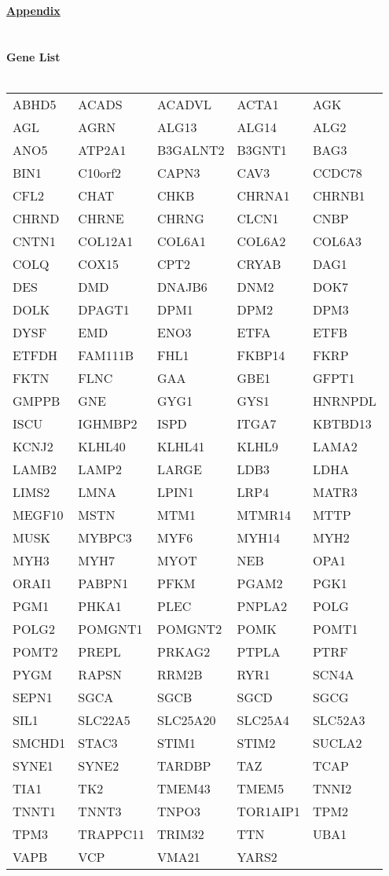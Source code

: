 {\Large \textbf{\underline{Appendix}}}
\\ \\ \\
{\Large \textbf{{Gene List}}}
\\ \\
\begin{small}
\begin{tabular}{ |p{3cm}|p{3cm}|p{3cm}|p{3cm}|p{3cm}| }
\hline

ABHD5 & ACADS & ACADVL & ACTA1 & AGK \\
AGL & AGRN & ALG13 & ALG14 & ALG2 \\
ANO5 & ATP2A1 & B3GALNT2 & B3GNT1 & BAG3 \\
BIN1 & C10orf2 & CAPN3 & CAV3 & CCDC78 \\
CFL2 & CHAT & CHKB & CHRNA1 & CHRNB1 \\
CHRND & CHRNE & CHRNG & CLCN1 & CNBP \\
CNTN1 & COL12A1 & COL6A1 & COL6A2 & COL6A3 \\
COLQ & COX15 & CPT2 & CRYAB & DAG1 \\
DES & DMD & DNAJB6 & DNM2 & DOK7 \\
DOLK & DPAGT1 & DPM1 & DPM2 & DPM3 \\
DYSF & EMD & ENO3 & ETFA & ETFB \\
ETFDH & FAM111B & FHL1 & FKBP14 & FKRP \\
FKTN & FLNC & GAA & GBE1 & GFPT1 \\
GMPPB & GNE & GYG1 & GYS1 & HNRNPDL \\
ISCU & IGHMBP2 & ISPD & ITGA7 & KBTBD13 \\
KCNJ2 & KLHL40 & KLHL41 & KLHL9 & LAMA2 \\
LAMB2 & LAMP2 & LARGE & LDB3 & LDHA \\
LIMS2 & LMNA & LPIN1 & LRP4 & MATR3 \\
MEGF10 & MSTN & MTM1 & MTMR14 & MTTP \\
MUSK & MYBPC3 & MYF6 & MYH14 & MYH2 \\
MYH3 & MYH7 & MYOT & NEB & OPA1 \\
ORAI1 & PABPN1 & PFKM & PGAM2 & PGK1 \\
PGM1 & PHKA1 & PLEC & PNPLA2 & POLG \\
POLG2 & POMGNT1 & POMGNT2 & POMK & POMT1 \\
POMT2 & PREPL & PRKAG2 & PTPLA & PTRF \\
PYGM & RAPSN & RRM2B & RYR1 & SCN4A \\
SEPN1 & SGCA & SGCB & SGCD & SGCG \\
SIL1 & SLC22A5 & SLC25A20 & SLC25A4 & SLC52A3 \\
SMCHD1 & STAC3 & STIM1 & STIM2 & SUCLA2 \\
SYNE1 & SYNE2 & TARDBP & TAZ & TCAP \\
TIA1 & TK2 & TMEM43 & TMEM5 & TNNI2 \\
TNNT1 & TNNT3 & TNPO3 & TOR1AIP1 & TPM2 \\
TPM3 & TRAPPC11 & TRIM32 & TTN & UBA1 \\
VAPB & VCP & VMA21 & YARS2 & \\

\hline
\end{tabular}
\end{small}
